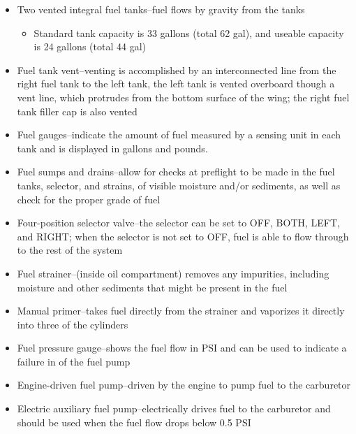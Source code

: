 \documentclass[twoside,openright]{report}
\begin{document}
\begin{itemize}
  \item Two vented integral fuel tanks--fuel flows by gravity from the tanks
    \begin{itemize}
      \item Standard tank capacity is 33 gallons (total 62 gal), and
        useable capacity is 24 gallons (total 44 gal)
    \end{itemize}

  \item Fuel tank vent--venting is accomplished by an interconnected line
    from the right fuel tank to the left tank, the left tank is vented
    overboard though a vent line, which protrudes from the bottom surface
    of the wing; the right fuel tank filler cap is also vented

  \item Fuel gauges--indicate the amount of fuel measured by a sensing unit
    in each tank and is displayed in gallons and pounds.

  \item Fuel sumps and drains--allow for checks at preflight to be made in
    the fuel tanks, selector, and strains, of visible moisture and/or
    sediments, as well as check for the proper grade of fuel

  \item Four-position selector valve--the selector can be set to OFF, BOTH,
    LEFT, and RIGHT; when the selector is not set to OFF, fuel is able to
    flow through to the rest of the system

  \item Fuel strainer--(inside oil compartment) removes any impurities,
    including moisture and other sediments that might be present in the
    fuel

  \item Manual primer--takes fuel directly from the strainer and vaporizes
    it directly into three of the cylinders

  \item Fuel pressure gauge--shows the fuel flow in PSI and can be used to
    indicate a failure in of the fuel pump

  \item Engine-driven fuel pump--driven by the engine to pump fuel to the
    carburetor

  \item Electric auxiliary fuel pump--electrically drives fuel to the
    carburetor and should be used when the fuel flow drops below 0.5 PSI
\end{itemize}
\end{document}
